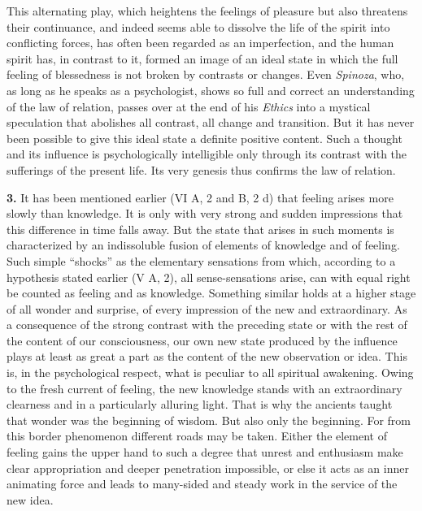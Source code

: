 \documentclass[12pt,a4paper]{book}
\newcommand{\opage}[1]{\marginnote{\footnotesize\textit{[#1]}}}
\begin{document}
This alternating play, which heightens the feelings of pleasure but
also threatens their continuance, and indeed seems able to dissolve the
life of the spirit into conflicting forces, has often been regarded as
an imperfection, and the human spirit has, in contrast to it, formed an
image of an ideal state in which the full feeling of blessedness is not
broken by contrasts or changes. Even \emph{Spinoza}, who, as long as he
speaks as a
\opage{330}psychologist, shows so full and correct an understanding of
the law of relation, passes over at the end of his \textit{Ethics} into
a mystical speculation that abolishes all contrast, all change and
transition. But it has never been possible to give this ideal state a
definite positive content. Such a thought and its influence is
psychologically intelligible only through its contrast with the
sufferings of the present life. Its very genesis thus confirms the law
of relation.

\textbf{3.} It has been mentioned earlier (VI A, 2 and B, 2 d) that
feeling arises more slowly than knowledge. It is only with very strong
and sudden impressions that this difference in time falls away. But the
state that arises in such moments is characterized by an indissoluble
fusion of elements of knowledge and of feeling. Such simple ``shocks''
as the elementary sensations from which, according to a hypothesis
stated earlier (V A, 2), all sense-sensations arise, can with equal
right be counted as feeling and as knowledge. Something similar holds at
a higher stage of all wonder and surprise, of every impression of the
new and extraordinary. As a consequence of the strong contrast with the
preceding state or with the rest of the content of our consciousness,
our own new state produced by the influence plays at least as great a
part as the content of the new observation or idea. This is, in the
psychological respect, what is peculiar to all spiritual awakening.
Owing to the fresh current of feeling, the new knowledge stands with an
extraordinary clearness and in a particularly alluring light. That is
why the ancients taught that wonder was the beginning of wisdom. But
also only the beginning. For from this border phenomenon different roads
may be taken. Either the element of feeling gains the upper hand to
such a degree that unrest and enthusiasm make clear appropriation and
deeper penetration impossible, or else it acts as an inner animating
force and leads to many-sided and steady work in the service of the new
idea.
\end{document}

